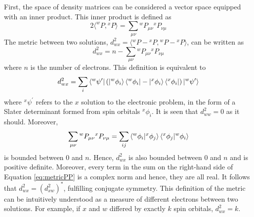 \documentclass[final,3p,times,twocolumn]{elsarticle}
\begin{document}
First, the space of density matrices can be considered a vector space equipped with an inner product. This inner product is defined as
\begin{equation} \label{eq:innerproduct}
2\langle ^wP,{}^xP \rangle = \sum_{\mu\nu}{}^wP_{\mu\nu}{}^xP_{\nu\mu}
\end{equation}
The metric between two solutions, $d_{wx}^2 = \langle {}^wP - {}^xP, {}^wP - {}^xP \rangle$, can be written as
\begin{equation} \label{eq:metric}
d_{wx}^2 = n - \sum_{\mu\nu}{}^wP_{\mu\nu}{}^xP_{\nu\mu}
\end{equation}
where $n$ is the number of electrons. This definition is equivalent to
\begin{equation}
d_{wx}^2 = \sum_i \bra{{}^w\psi^\prime} (\ket{{}^w\phi_i}\bra{{}^w\phi_i} - \ket{{}^x\phi_i}\bra{{}^x\phi_i}) \ket{{}^w\psi^\prime}
\end{equation}
where ${}^x\psi^\prime$ refers to the $x$ solution to the electronic problem, in the form of a Slater determinant formed from spin orbitals $^x\phi_i$. It is seen that $d_{ww}^2 = 0$ as it should. Moreover, 
\begin{equation} \label{eq:metricPP}
\sum_{\mu\nu}{}^wP_{\mu\nu}{}^xP_{\nu\mu} = \sum_{ij} \bra{^w\phi_i}\ket{^x\phi_j}\bra{^x\phi_j}\ket{^w\phi_i}
\end{equation}
is bounded between 0 and $n$. Hence, $d_{wx}^2$ is also bounded between 0 and $n$ and is positive definite. Moreover, every term in the sum on the right-hand side of Equation \eqref{eq:metricPP} is a complex norm and hence, they are all real. It follows that $d_{wx}^2 = (d_{xw}^2)^*$, fulfilling conjugate symmetry. This definition of the metric can be intuitively understood as a measure of different electrons between two solutions. For example, if $x$ and $w$ differed by exactly $k$ spin orbitals, $d_{wx}^2 = k$. 
\end{document}
